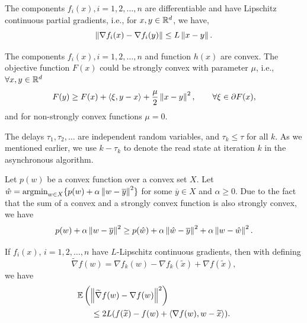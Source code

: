 \begin{Assumption}\label{Assump1}
The components $f_i(x), i=1,2,\ldots,n$ are differentiable and have Lipschitz continuous partial gradients, i.e., for $x,y\in \mathbb{R}^d$, we have,
\begin{equation}
    \left\lVert\nabla f_i(x) - \nabla f_i(y)\right\rVert \leq L \left\lVert x-y\right\rVert.
\end{equation}
\end{Assumption}
\begin{Assumption}[Convexity]\label{Assump2}
The components $f_i(x), i=1,2,\ldots,n$ and function $h(x)$ are convex. The objective function $F(x)$ could be strongly convex with parameter $\mu$, i.e., 
$\forall x,y \in \mathbb{R}^d$
\begin{equation}\label{Convex:Eq1}
F(y)\geq F(x) + \left\langle \xi,y-x\right\rangle + \frac{\mu}{2}\left\lVert x-y\right\rVert^2,\qquad \forall \xi\in\partial F(x),
\end{equation}
and for non-strongly convex functions $\mu=0$. 
\end{Assumption}

\begin{Assumption}\label{Assump3}
The delays $\tau_1,\tau_2,\ldots$ are independent random variables, and $\tau_k\leq \tau$ for all $k$. As we mentioned earlier, we use $k-\tau_k$ to denote the read state at iteration $k$ in the asynchronous algorithm.
\end{Assumption}

Let $p(w)$ be a convex function over a convex set $X$. Let $\hat{w} = \text{argmin}_{w\in X}\{p(w)+\alpha\left\lVert w-\overline{y}\right\rVert^2\}$ for some $\overline{y}\in X$ and $\alpha\geq 0$. Due to the fact that the sum of a convex and a strongly convex function is also strongly convex,  we have
\begin{equation}\label{threepoint-convex}
 p(w)+\alpha\left\lVert w-\overline{y}\right\rVert^2 \geq p(\hat{w})+\alpha\left\lVert\hat{w}-\overline{y}\right\rVert^2+\alpha\left\lVert w-\hat{w}\right\rVert^2.
\end{equation}


\begin{lemma}\label{lemma0}\cite{Johnson12,Allen-Zhu17} If $f_i(x)$, $i=1,2,\ldots,n$ have $L$-Lipschitz continuous gradients, then with defining 
\[
\widetilde{\nabla} f(w) = \nabla f_k(w) - \nabla f_k(\widetilde{x})+ \nabla f(\widetilde{x}),
\]
we have
\begin{equation}
\begin{split}
\mathbb{E}&\left(\left\lVert\widetilde{\nabla} f(w)-\nabla f(w)\right\rVert^2\right)\\
&~~~\leq 2L (f(\widetilde{x})-f(w)+\left\langle \nabla f(w),w-\widetilde{x}\right\rangle).
\end{split}
\end{equation}
\end{lemma}

